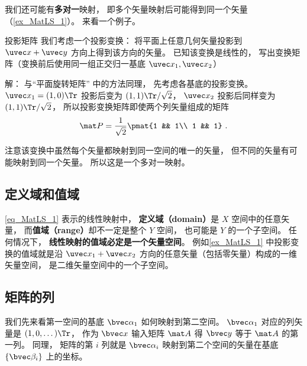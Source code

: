 我们还可能有\textbf{多对一}映射， 即多个矢量映射后可能得到同一个矢量（\autoref{ex_MatLS_1}）。 来看一个例子。

\begin{example}{投影矩阵}\label{ex_MatLS_1}
我们考虑一个投影变换： 将平面上任意几何矢量投影到 $\uvec x + \uvec y$ 方向上得到该方向的矢量。 已知该变换是线性的， 写出变换矩阵（变换前后使用同一组正交归一基底 $\uvec x_1, \uvec x_2$）

解： 与“平面旋转矩阵” 中的方法同理， 先考虑各基底的投影变换。 $\uvec x_1 = (1, 0)\Tr$ 投影后变为 $(1, 1)\Tr /\sqrt2$， $\uvec x_2$ 投影后同样变为 $(1, 1)\Tr /\sqrt2$， 所以投影变换矩阵即使两个列矢量组成的矩阵
\begin{equation}
\mat P = \frac{1}{\sqrt{2}} \pmat{1 && 1\\ 1 && 1}~.
\end{equation}

注意该变换中虽然每个矢量都映射到同一空间的唯一的矢量， 但不同的矢量有可能映射到同一个矢量。 所以这是一个多对一映射。
\end{example}

\subsection{定义域和值域}
\autoref{eq_MatLS_1} 表示的线性映射中， \textbf{定义域（domain）}是 $X$ 空间中的任意矢量， 而\textbf{值域（range）}却不一定是整个 $Y$ 空间， 也可能是 $Y$ 的一个子空间。 任何情况下， \textbf{线性映射的值域必定是一个矢量空间}。 例如\autoref{ex_MatLS_1} 中投影变换的值域就是沿 $\uvec x_1 + \uvec x_2$ 方向的任意矢量（包括零矢量）构成的一维矢量空间， 是二维矢量空间中的一个子空间。


\subsection{矩阵的列}
我们先来看第一空间的基底 $\bvec \alpha_1$ 如何映射到第二空间。 $\bvec\alpha_1$ 对应的列矢量是 $(1, 0, \dots)\Tr$， 作为 $\bvec x$ 输入矩阵 $\mat A$ 得 $\bvec y$ 等于 $\mat A$ 的第一列。 同理， 矩阵的第 $i$ 列就是 $\bvec\alpha_i$ 映射到第二个空间的矢量在基底 $\{\bvec \beta_i\}$ 上的坐标。


